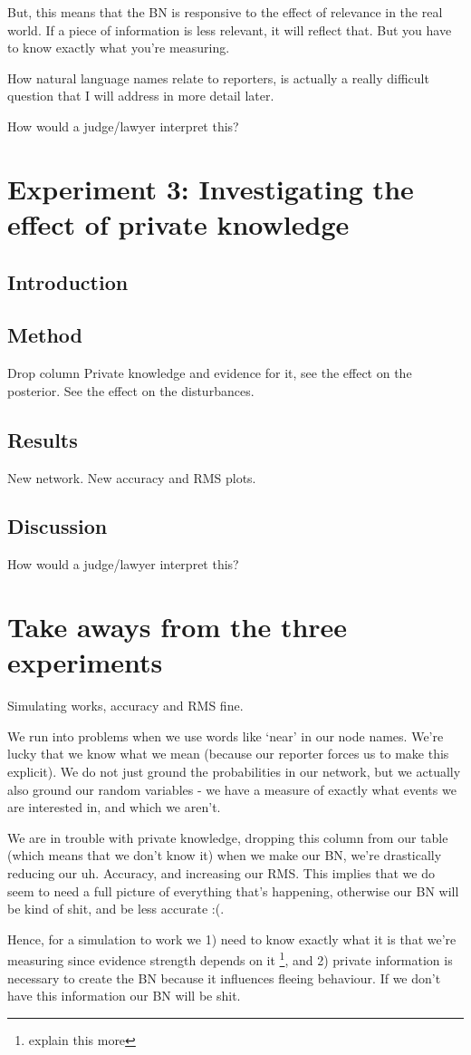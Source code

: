 But, this means that the BN is responsive to the effect of relevance in the real world. If a piece of information is less relevant, it will reflect that. But you have to know exactly what you're measuring.

How natural language names relate to reporters, is actually a really difficult question that I will address in more detail later.

How would a judge/lawyer interpret this?


\section{Experiment 3: Investigating the effect of private knowledge}

\subsection{Introduction}

\subsection{Method}
Drop column Private knowledge and evidence for it, see the effect on the posterior. See the effect on the disturbances.


\subsection{Results}
New network.
New accuracy and RMS plots.

\subsection{Discussion}

How would a judge/lawyer interpret this?


\section{Take aways from the three experiments}

Simulating works, accuracy and RMS fine.

We run into problems when we use words like `near' in our node names. We're lucky that we know what we mean (because our reporter forces us to make this explicit). We do not just ground the probabilities in our network, but we actually also ground our random variables - we have a measure of exactly what events we are interested in, and which we aren't.

We are in trouble with private knowledge, dropping this column from our table (which means that we don't know it) when we make our BN, we're drastically reducing our uh. Accuracy, and increasing our RMS. This implies that we do seem to need a full picture of everything that's happening, otherwise our BN will be kind of shit, and be less accurate :(.

Hence, for a simulation to work we 1) need to know exactly what it is that we're measuring since evidence strength depends on it \footnote{explain this more}, and 2) private information is necessary to create the BN because it influences fleeing behaviour. If we don't have this information our BN will be shit.


